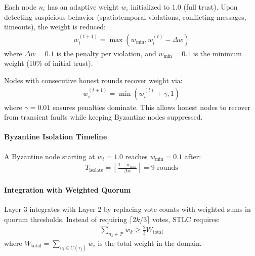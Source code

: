 \documentclass[lettersize,journal]{IEEEtran}
\begin{document}
Each node $n_i$ has an adaptive weight $w_i$ initialized to $1.0$
(full trust). Upon detecting suspicious behavior (spatiotemporal violations,
conflicting messages, timeouts), the weight is reduced:
\begin{equation}
\begin{aligned}
w_i^{(t+1)} = \max(w_{\min}, w_i^{(t)} - \Delta w)
\label{eq:weight_penalty}
\end{aligned}
\end{equation}
where $\Delta w = 0.1$ is the penalty per violation, and
$w_{\min} = 0.1$ is the minimum weight (10\% of initial trust).

Nodes with consecutive honest rounds recover weight via:
\begin{equation}
\begin{aligned}
w_i^{(t+1)} = \min(w_i^{(t)} + \gamma, 1)
\label{eq:weight_recovery}
\end{aligned}
\end{equation}
where $\gamma = 0.01$ ensures penalties dominate. This allows
honest nodes to recover from transient faults while keeping Byzantine nodes
suppressed.

\paragraph{Byzantine Isolation Timeline}
\label{sec:isolation_timeline}

A Byzantine node starting at $w_i = 1.0$ reaches
$w_{\min} = 0.1$ after:
\begin{equation}
\begin{aligned}
T_{\text{isolate}} = \left\lceil \frac{1 - w_{\min}}{\Delta w} \right\rceil
= 9 \text{ rounds}
\label{eq:isolation_time}
\end{aligned}
\end{equation}

\paragraph{Integration with Weighted Quorum}
\label{sec:weighted_integration}

Layer 3 integrates with Layer 2 by replacing vote counts with weighted sums
in quorum thresholds. Instead of requiring $\lceil 2k/3 \rceil$ votes, STLC
requires:
\begin{equation}
\begin{aligned}
\sum_{n_k \in \mathcal{P}} w_k \geq \frac{2}{3} W_{\text{total}}
\label{eq:weighted_threshold}
\end{aligned}
\end{equation}
where $W_{\text{total}} = \sum_{n_i \in C(\tau_j)} w_i$ is the total
weight in the domain.
\end{document}
